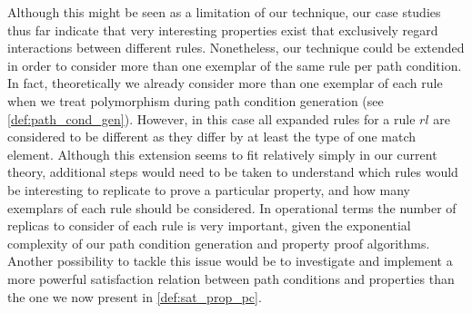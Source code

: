 Although this might be seen as a limitation of our technique, our case studies thus far indicate that very interesting properties exist that exclusively regard interactions between different rules. Nonetheless, our technique could be extended in order to consider more than one exemplar of the same rule per path condition. In fact, theoretically we already consider more than one exemplar of each rule when we treat polymorphism during path condition generation (see \cref{def:path_cond_gen}). However, in this case all expanded rules for a rule $rl$ are considered to be different as they differ by at least the type of one match element. Although this extension seems to fit relatively simply in our current theory, additional steps would need to be taken to understand which rules would be interesting to replicate to prove a particular property, and how many exemplars of each rule should be considered. In operational terms the number of replicas to consider of each rule is very important, given the exponential complexity of our path condition generation and property proof algorithms. Another possibility to tackle this issue would be to investigate and implement a more powerful satisfaction relation between path conditions and properties than the one we now present in \cref{def:sat_prop_pc}.



